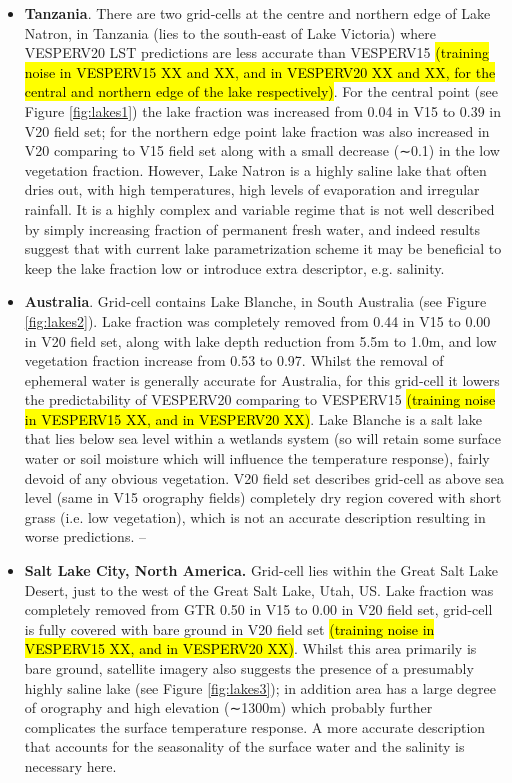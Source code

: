 \documentclass[hess, twostagejnl]{copernicus}
\begin{document}
\begin{itemize}
	\item \textbf{Tanzania}. There are two grid-cells at the centre and northern edge of Lake Natron, in Tanzania (lies to the south-east of Lake Victoria) where VESPERV20 LST predictions are less accurate than VESPERV15 \hl{(training noise in VESPERV15 XX and XX, and in VESPERV20 XX and XX, for the central and northern edge of the lake respectively)}. For the central point (see Figure \ref{fig:lakes1}) the lake fraction was increased from 0.04 in V15 to 0.39 in V20 field set; for the northern edge point lake fraction was also increased in V20 comparing to V15 field set along with a small decrease (∼0.1) in the low vegetation fraction. However, Lake Natron is a highly saline lake that often dries out, with high temperatures, high levels of evaporation and irregular rainfall. It is a highly complex and variable regime that is not well described by simply increasing fraction of permanent fresh water, and indeed results suggest that with current lake parametrization scheme it may be beneficial to keep the lake fraction low or introduce extra descriptor, e.g. salinity. 
	\item \textbf{Australia}. Grid-cell contains Lake Blanche, in South Australia (see Figure \ref{fig:lakes2}). Lake fraction was completely removed from 0.44 in V15 to 0.00 in V20 field set, along with lake depth reduction from 5.5m to 1.0m, and low vegetation fraction increase from 0.53 to 0.97. Whilst the removal of ephemeral water is generally accurate for Australia, for this grid-cell it lowers the predictability of VESPERV20 comparing to VESPERV15 \hl{(training noise in VESPERV15 XX, and in VESPERV20 XX)}. Lake Blanche is a salt lake that lies below sea level within a wetlands system (so will retain some surface water or soil moisture which will influence the temperature response), fairly devoid of any obvious vegetation. V20 field set describes grid-cell as above sea level (same in V15 orography fields) completely dry region covered with short grass (i.e. low vegetation), which is not an accurate description resulting in worse predictions.
	–\item \textbf{Salt Lake City, North America.} Grid-cell lies within the Great Salt Lake Desert, just to the west of the Great Salt Lake, Utah, US. Lake fraction was completely removed from GTR 0.50 in V15 to 0.00 in V20 field set, grid-cell is fully covered with bare ground in V20 field set \hl{(training noise in VESPERV15 XX, and in VESPERV20 XX)}. Whilst this area primarily is bare ground, satellite imagery also suggests the presence of a presumably highly saline lake (see Figure \ref{fig:lakes3}); in addition area has a large degree of orography and high elevation (∼1300m) which probably further complicates the surface temperature response. A more accurate description that accounts for the seasonality of the surface water and the salinity is necessary here.

\end{itemize}
\end{document}
